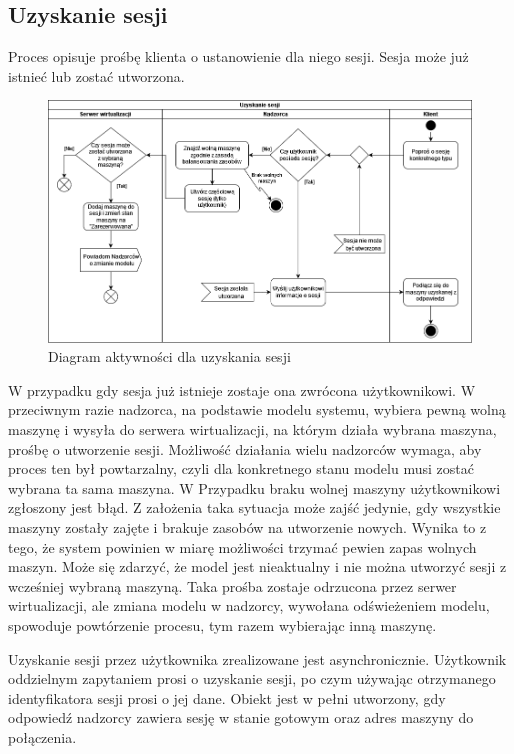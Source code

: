 \documentclass[../opis-rozwiazania.tex]{subfiles}
\begin{document}
\label{diagrams:activity_diagrams}

\subsection{Uzyskanie sesji}

Proces opisuje prośbę klienta o ustanowienie dla niego sesji. Sesja może już istnieć lub zostać utworzona.

\begin{figure}[H]
  \centering
  \includegraphics[width=\textwidth]{../diagrams/activity_diagrams/uzyskanie_sesji_v2.png}
  \caption{Diagram aktywności dla uzyskania sesji}
  \label{start_session}
\end{figure}

W przypadku gdy sesja już istnieje zostaje ona zwrócona użytkownikowi.
W przeciwnym razie nadzorca, na podstawie modelu systemu, wybiera pewną wolną maszynę i wysyła do serwera wirtualizacji, na którym działa wybrana maszyna, prośbę o utworzenie sesji. Możliwość działania wielu nadzorców wymaga, aby proces ten był powtarzalny, czyli dla konkretnego stanu modelu musi zostać wybrana ta sama maszyna.
W Przypadku braku wolnej maszyny użytkownikowi zgłoszony jest błąd.
Z założenia taka sytuacja może zajść jedynie, gdy wszystkie maszyny zostały zajęte i brakuje zasobów na utworzenie nowych. Wynika to z tego, że system powinien w miarę możliwości trzymać pewien zapas wolnych maszyn.
Może się zdarzyć, że model jest nieaktualny i nie można utworzyć sesji z wcześniej wybraną maszyną.
Taka prośba zostaje odrzucona przez serwer wirtualizacji, ale zmiana modelu w nadzorcy, wywołana odświeżeniem modelu, spowoduje powtórzenie procesu, tym razem wybierając inną maszynę.

Uzyskanie sesji przez użytkownika zrealizowane jest asynchronicznie.
Użytkownik oddzielnym zapytaniem prosi o uzyskanie sesji, po czym używając otrzymanego identyfikatora sesji prosi o jej dane.
Obiekt jest w pełni utworzony, gdy odpowiedź nadzorcy zawiera sesję w stanie gotowym oraz adres maszyny do połączenia.
\end{document}
